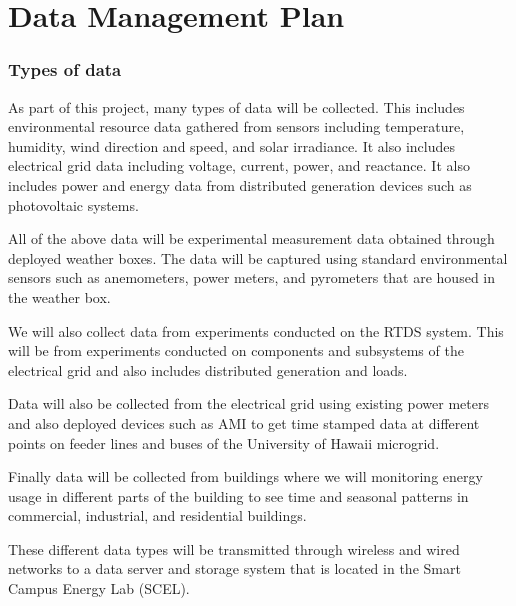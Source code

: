 
\section*{Data Management Plan}

\subsubsection*{Types of data}

As part of this project, many types of data will be collected. This includes environmental resource data gathered from sensors including temperature, humidity, wind direction and speed, and solar irradiance. It also includes electrical grid data including voltage, current, power, and reactance. It also includes power and energy data from distributed generation devices such as photovoltaic systems.

All of the above data will be experimental measurement data obtained through deployed weather boxes. The data will be captured using standard environmental sensors such as anemometers, power meters,  and pyrometers that are housed in the weather box. 

We will also collect data from experiments conducted on the RTDS system.  This will be from experiments conducted on components and subsystems of the electrical grid and also includes distributed generation and loads.

Data will also be collected from the electrical grid using existing power meters and also deployed devices such as AMI to get time stamped data at different points on feeder lines and buses of the University of Hawaii microgrid.

Finally data will be collected from buildings where we will monitoring energy usage in different parts of the building to see time and seasonal patterns in commercial, industrial, and residential buildings. 
  
These different data types will be transmitted through wireless and wired networks to a data server and storage system that is located in the Smart Campus Energy Lab (SCEL).  

